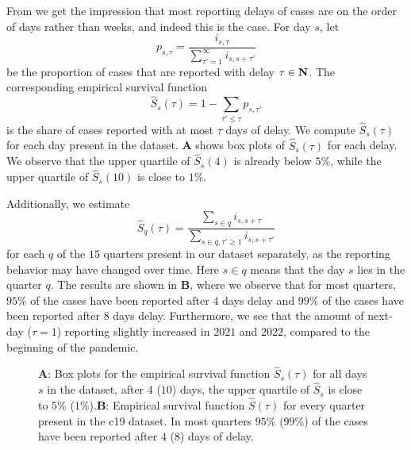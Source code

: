 From  we get the impression that most reporting delays of cases are on the order of days rather than weeks, and indeed this is the case. For day $s$, let
$$
    p_{s,\tau} = \frac{i_{s,\tau}}{\sum_{\tau' = 1}^\infty i_{s,s + \tau'}}
$$
be the proportion of cases that are reported with delay $\tau \in\mathbf N$. The corresponding empirical survival function 
$$
    \hat S_{s}(\tau) = 1 - \sum_{\tau' \leq \tau} p_{s,\tau'}
$$
is the share of cases reported with at most $\tau$ days of delay. We compute $\hat S_s(\tau)$ for each day present in the dataset.  \textbf{A} shows box plots of $\hat S_{s}(\tau)$ for each delay. We observe that the upper quartile of $\hat S_s(4)$ is already below $5\%$, while the upper quartile of $\hat S_s(10)$ is close to $1\%$. 

Additionally, we estimate 
$$
    \hat S_{q}(\tau) = \frac{\sum_{s \in q} i_{s,s + \tau}}{\sum_{s \in q, \tau' \geq 1} i_{s, s+ \tau'}}
$$
for each $q$ of the $15$ quarters present in our dataset separately, as the reporting behavior may have changed over time. Here $s\in q$ means that the day $s$ lies in the quarter $q$. The results are shown in  \textbf{B}, where we observe that for most quarters, $95\%$ of the cases have been reported after $4$ days delay and $99\%$ of the cases have been reported after $8$ days delay. 
Furthermore, we see that the amount of next-day ($\tau = 1$) reporting slightly increased in $2021$ and $2022$, compared to the beginning of the pandemic.

\begin{figure}
    \resizebox{\textwidth}{!}{%
    }
    \caption{\textbf{A}: Box plots for the empirical survival function $\hat S_{s}(\tau)$ for all days $s$ in the dataset, after $4$ ($10$) days, the upper quartile of $\hat S_{s}$ is close to $5\%$ ($1\%$).\textbf{B}: Empirical survival function $\hat S(\tau)$ for every quarter present in the \acrshort{c19} dataset. In most quarters $95\%$ ($99\%$) of the cases have been reported after $4$ ($8$) days of delay.}
    \label{fig:survival_function_rep_tri_incidences}
\end{figure}


